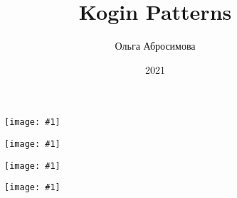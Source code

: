 \documentclass[12pt,twoside,openany,b5paper]{book}
\newcommand{\figp}[1]{
  \begin{figure}
  \begin{center}
  \texttt{[image: \#1]}
  \end{center}
  \end{figure}
}
\begin{document}
\title{Kogin Patterns}
\author{Ольга Абросимова}
\date{2021}
\maketitle

\figp{1}

\figp{2}

\figp{3}

\figp{4}
\end{document}
